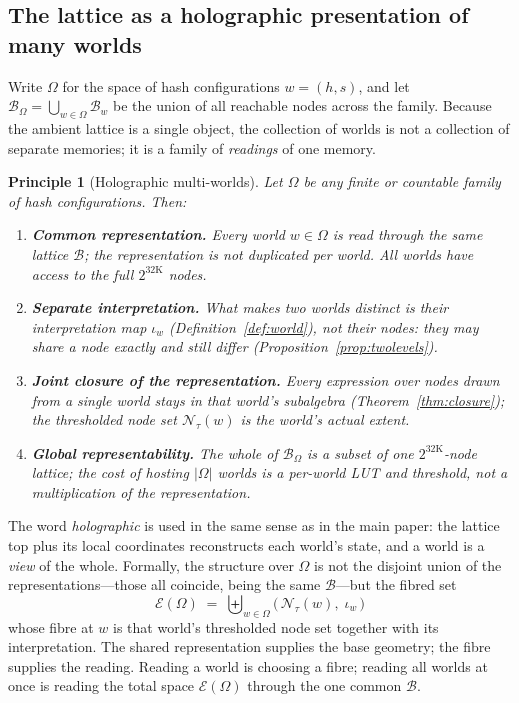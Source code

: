 \documentclass[11pt,a4paper]{article}
\newtheorem{principle}{Principle}[section]
\theoremstyle{remark}
\newcommand{\Lat}{\ensuremath{\mathcal{B}}}         %
\newcommand{\iotaw}{\ensuremath{\iota_{w}}}         %
\begin{document}
\subsection{The lattice as a holographic presentation of many worlds}

Write $\Omega$ for the space of hash configurations $w=(h,s)$, and let
$\Lat_\Omega=\bigcup_{w\in\Omega}\Lat_w$ be the union of all reachable nodes
across the family. Because the ambient lattice is a single object, the
collection of worlds is not a collection of separate memories; it is a family of
\emph{readings} of one memory.

\begin{principle}[Holographic multi-worlds]
\label{prin:holographic}
Let $\Omega$ be any finite or countable family of hash configurations. Then:
\begin{enumerate}[leftmargin=*,nosep]
  \item \textbf{Common representation.} Every world $w\in\Omega$ is read
    through the same lattice $\Lat$; the representation is not duplicated per
    world. All worlds have access to the full $2^{32\mathrm{K}}$ nodes.
  \item \textbf{Separate interpretation.} What makes two worlds distinct is
    their interpretation map $\iotaw$ (Definition~\ref{def:world}),
    not their nodes: they may share a node exactly and still differ
    (Proposition~\ref{prop:twolevels}).
  \item \textbf{Joint closure of the representation.} Every expression over
    nodes drawn from a \emph{single} world stays in that world's subalgebra
    (Theorem~\ref{thm:closure}); the thresholded node set
    $\mathcal{N}_\tau(w)$ is the world's actual extent.
  \item \textbf{Global representability.} The whole of $\Lat_\Omega$ is a
    subset of one $2^{32\mathrm{K}}$-node lattice; the cost of hosting
    $|\Omega|$ worlds is a per-world LUT and threshold, not a multiplication of
    the representation.
\end{enumerate}
\end{principle}

The word \emph{holographic} is used in the same sense as in the main paper: the
lattice top plus its local coordinates reconstructs each world's state, and a
world is a \emph{view} of the whole. Formally, the structure over $\Omega$ is
not the disjoint union of the representations---those all coincide, being the
same $\Lat$---but the fibred set
\begin{equation}
  \mathcal{E}(\Omega) \;=\; \biguplus_{w\in\Omega}
  \bigl(\,\mathcal{N}_\tau(w),\; \iotaw\,\bigr)
\end{equation}
whose fibre at $w$ is that world's thresholded node set together with its
interpretation. The shared representation supplies the base geometry; the
fibre supplies the reading. Reading a world is choosing a fibre; reading all
worlds at once is reading the total space $\mathcal{E}(\Omega)$ through the one
common $\Lat$.
\end{document}
